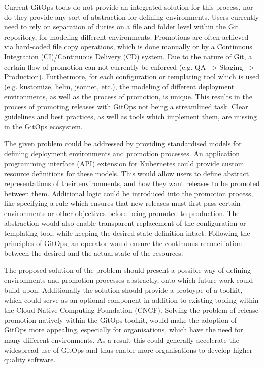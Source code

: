 \noindent
Current GitOps tools do not provide an integrated solution for this process,
nor do they provide any sort of abstraction for defining environments.
Users currently need to rely on separation of duties
on a file and folder level within the Git repository,
for modeling different environments.
Promotions are often achieved via hard-coded file copy operations,
which is done manually or by a
Continuous Integration (CI)/Continuous Delivery (CD) system.
Due to the nature of Git, a certain flow of promotion can not currently be enforced
(e.g. QA --> Staging --> Production).
Furthermore, for each configuration or templating tool which is used
(e.g. kustomize, helm, jsonnet, etc.),
the modeling of different deployment environments, as well as the
process of promotion, is unique.
This results in the process of promoting releases with GitOps
not being a streamlined task.
Clear guidelines and best practices,
as well as tools which implement them,
are missing in the GitOps ecosystem.
\bigskip


\noindent
%
The given problem could be addressed by
providing standardised models 
for defining deployment environments and promotion processes.
%
An application programming interface (API) extension for Kubernetes
could provide custom resource definitions for these models.
%
This would allow users to define abstract representations of
their environments,
and how they want releases to be promoted between them.
%
Additional logic could be introduced into the promotion process,
like specifying a rule which ensures that new releases must first pass
certain environments or other objectives before being promoted to production.
%
The abstraction would also enable transparent replacement of the
configuration or templating tool,
while keeping the desired state definition intact.
%
Following the principles of GitOps,
an operator would ensure the continuous reconciliation
between the desired and the actual state of the resources.
\bigskip


\noindent
%
The proposed solution of the problem should
present a possible way of defining environments and promotion processes abstractly,
onto which future work could build upon.
%
Additionally the solution should
provide a protoype of a toolkit,
which could serve as an optional component
in addition to existing tooling within the Cloud Native Computing Foundation (CNCF).
%
Solving the problem of release promotion natively within the GitOps toolkit,
would make the adoption of GitOps more appealing,
especially for organisations, which have the need for many different environments.
%
As a result
this could generally accelerate the widespread use of GitOps
and thus enable more organisations to develop higher quality software.
%








